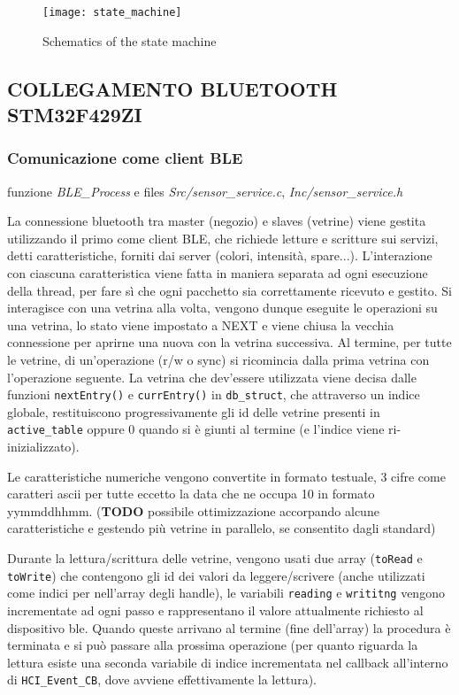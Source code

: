 \begin{figure}
	\texttt{[image: state\_machine]}
	\caption{Schematics of the state machine}
\end{figure}

\subsection{COLLEGAMENTO BLUETOOTH STM32F429ZI}

\subsubsection{Comunicazione come client BLE}

funzione \textit{BLE\_Process} e files \textit{Src/sensor\_service.c}, \textit{Inc/sensor\_service.h}

La connessione bluetooth tra master (negozio) e slaves (vetrine) viene gestita utilizzando il primo come client BLE, che richiede letture e scritture sui servizi, detti caratteristiche, forniti dai server (colori, intensit\`{a}, spare...). L'interazione con ciascuna caratteristica viene fatta in maniera separata ad ogni esecuzione della thread, per fare s\`{i} che ogni pacchetto sia correttamente ricevuto e gestito. Si interagisce con una vetrina alla volta, vengono dunque eseguite le operazioni su una vetrina, lo stato viene impostato a NEXT e viene chiusa la vecchia connessione per aprirne una nuova con la vetrina successiva. Al termine, per tutte le vetrine, di un'operazione (r/w o sync) si ricomincia dalla prima vetrina con l'operazione seguente. La vetrina che dev'essere utilizzata viene decisa dalle funzioni \texttt{nextEntry()} e \texttt{currEntry()} in \texttt{db\_struct}, che attraverso un indice globale, restituiscono progressivamente gli id delle vetrine presenti in \texttt{active\_table} oppure 0 quando si \`{e} giunti al termine (e l'indice viene ri-inizializzato). 

Le caratteristiche numeriche vengono convertite in formato testuale, 3 cifre come caratteri ascii per tutte eccetto la data che ne occupa 10 in formato yymmddhhmm. (\textbf{TODO} possibile ottimizzazione accorpando alcune caratteristiche e gestendo pi\`{u} vetrine in parallelo, se consentito dagli standard)

Durante la lettura/scrittura delle vetrine, vengono usati due array (\texttt{toRead} e \texttt{toWrite}) che contengono gli id dei valori da leggere/scrivere (anche utilizzati come indici per nell'array degli handle), le variabili \texttt{reading} e \texttt{writitng} vengono incrementate ad ogni passo e rappresentano il valore attualmente richiesto al dispositivo ble. Quando queste arrivano al termine (fine dell'array) la procedura \`{e} terminata e si pu\`{o} passare alla prossima operazione (per quanto riguarda la lettura esiste una seconda variabile di indice incrementata nel callback all'interno di \texttt{HCI\_Event\_CB}, dove avviene effettivamente la lettura).

